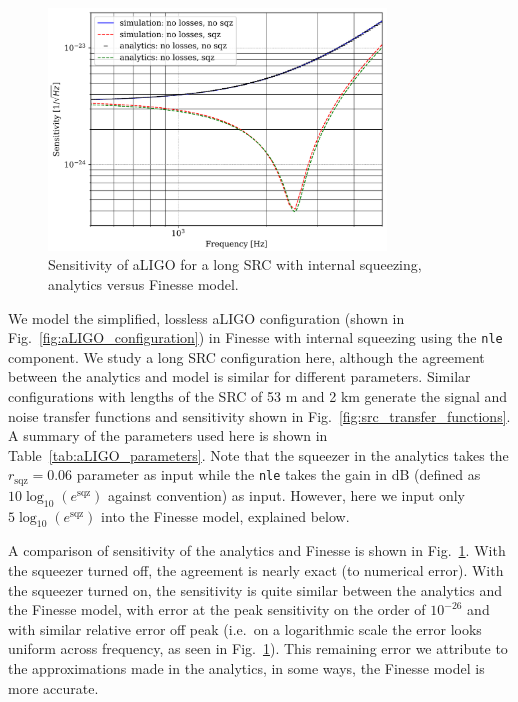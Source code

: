 \documentclass[aps,pra,superscriptaddress,reprint,nofootinbib]{revtex4-1}
\newcommand{\code}[1]{\texttt{#1}}
\begin{document}
\begin{figure}
	\begin{center}
	\includegraphics[width=0.8\textwidth]{figures/sqz_aLIGO_analytics_v_simulation.pdf}
	\end{center}
	\caption{Sensitivity of aLIGO for a long SRC with internal squeezing, analytics versus Finesse model.}
	\label{fig:sqz_aLIGO_analytics_v_simulation}
\end{figure}

We model the simplified, lossless aLIGO configuration (shown in Fig.~\ref{fig:aLIGO_configuration}) in Finesse with internal squeezing using the \code{nle} component. We study a long SRC configuration here, although the agreement between the analytics and model is similar for different parameters. Similar configurations with lengths of the SRC of 53 m and 2 km generate the signal and noise transfer functions and sensitivity shown in Fig.~\ref{fig:src_transfer_functions}. A summary of the parameters used here is shown in Table~\ref{tab:aLIGO_parameters}. Note that the squeezer in the analytics takes the $r_\mathrm{sqz} = 0.06$ parameter as input while the \code{nle} takes the gain in dB (defined as $10 \log_{10}(e^\mathrm{sqz})$ against convention) as input. However, here we input only $5 \log_{10}(e^\mathrm{sqz})$ into the Finesse model, explained below.


A comparison of sensitivity of the analytics and Finesse is shown in Fig.~\ref{fig:sqz_aLIGO_analytics_v_simulation}. With the squeezer turned off, the agreement is nearly exact (to numerical error). With the squeezer turned on, the sensitivity is quite similar between the analytics and the Finesse model, with error at the peak sensitivity on the order of $10^{-26}$ and with similar relative error off peak (i.e.\ on a logarithmic scale the error looks uniform across frequency, as seen in Fig.~\ref{fig:sqz_aLIGO_analytics_v_simulation}). This remaining error we attribute to the approximations made in the analytics, in some ways, the Finesse model is more accurate.
\end{document}
